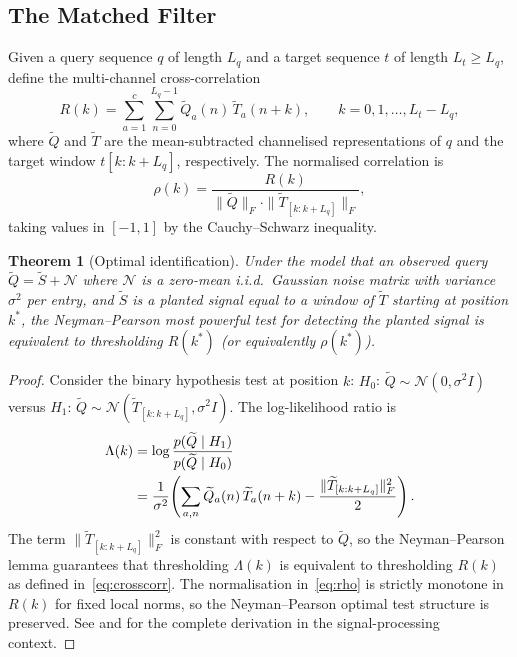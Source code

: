 \documentclass[twocolumn,11pt,a4paper]{article}
\newtheorem{theorem}{Theorem}[section]
\theoremstyle{definition}
\theoremstyle{remark}
\begin{document}
\subsection{The Matched Filter}

Given a query sequence $q$ of length $L_q$ and a target sequence $t$ of length
$L_t \geq L_q$, define the multi-channel cross-correlation
\begin{equation}
  R(k) = \sum_{a=1}^{c} \sum_{n=0}^{L_q - 1}
    \widetilde{Q}_a(n)\, \widetilde{T}_a(n + k),
  \qquad k = 0, 1, \ldots, L_t - L_q,
  \label{eq:crosscorr}
\end{equation}
where $\widetilde{Q}$ and $\widetilde{T}$ are the mean-subtracted channelised
representations of $q$ and the target window $t[k:k+L_q]$, respectively.
The normalised correlation is
\begin{equation}
  \rho(k) = \frac{R(k)}{\|\widetilde{Q}\|_F \cdot \|\widetilde{T}_{[k:k+L_q]}\|_F},
  \label{eq:rho}
\end{equation}
taking values in $[-1, 1]$ by the Cauchy--Schwarz inequality.

\begin{theorem}[Optimal identification]
\label{thm:optimal}
Under the model that an observed query $\widetilde{Q} = \widetilde{S} + \mathcal{N}$
where $\mathcal{N}$ is a zero-mean i.i.d.\ Gaussian noise matrix with variance
$\sigma^2$ per entry, and $\widetilde{S}$ is a planted signal equal to a window
of $\widetilde{T}$ starting at position $k^*$, the Neyman--Pearson most
powerful test for detecting the planted signal is equivalent to thresholding
$R(k^*)$ (or equivalently $\rho(k^*)$).
\end{theorem}

\begin{proof}
Consider the binary hypothesis test at position $k$:
$H_0$: $\widetilde{Q} \sim \mathcal{N}(0, \sigma^2 I)$ versus
$H_1$: $\widetilde{Q} \sim \mathcal{N}(\widetilde{T}_{[k:k+L_q]}, \sigma^2 I)$.
The log-likelihood ratio is
\begin{align}
  \Lambda(k) &= \log \frac{p(\widetilde{Q} \mid H_1)}{p(\widetilde{Q} \mid H_0)} \notag \\
  &= \frac{1}{\sigma^2}\!\left(
      \sum_{a,n} \widetilde{Q}_a(n)\, \widetilde{T}_a(n+k)
      - \frac{\|\widetilde{T}_{[k:k+L_q]}\|_F^2}{2}
    \right).
\end{align}
The term $\|\widetilde{T}_{[k:k+L_q]}\|_F^2$ is constant with respect to
$\widetilde{Q}$, so the Neyman--Pearson lemma \citep{neyman1933} guarantees
that thresholding $\Lambda(k)$ is equivalent to thresholding $R(k)$ as defined
in~\eqref{eq:crosscorr}. The normalisation in~\eqref{eq:rho} is strictly
monotone in $R(k)$ for fixed local norms, so the Neyman--Pearson optimal test
structure is preserved. See \citet{turin1960} and \citet{kay1998} for the
complete derivation in the signal-processing context.
\end{proof}
\end{document}
